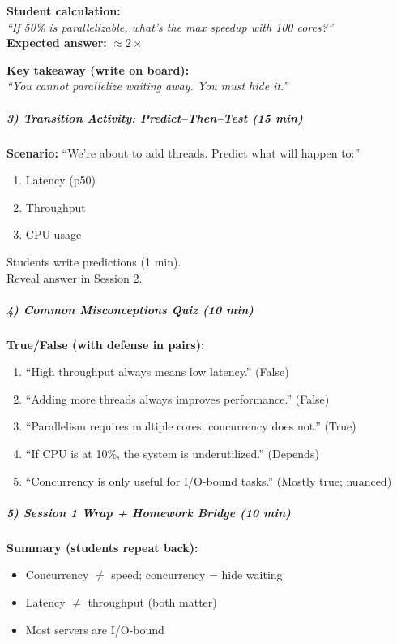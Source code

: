 \documentclass[11pt,a4paper]{article}
\begin{document}
\textbf{Student calculation:}\\
\textit{``If 50\% is parallelizable, what's the max speedup with 100 cores?''}\\
\textbf{Expected answer:} $\approx 2\times$

\textbf{Key takeaway (write on board):}\\
\textit{``You cannot parallelize waiting away. You must hide it.''}

\subparagraph{3) Transition Activity: Predict--Then--Test (15 min)}

\textbf{Scenario:} ``We're about to add threads. Predict what will happen to:''

\begin{enumerate}[leftmargin=*]
\item Latency (p50)
\item Throughput
\item CPU usage
\end{enumerate}

Students write predictions (1 min).\\
Reveal answer in Session 2.

\subparagraph{4) Common Misconceptions Quiz (10 min)}

\textbf{True/False (with defense in pairs):}
\begin{enumerate}[leftmargin=*]
\item ``High throughput always means low latency.'' (False)
\item ``Adding more threads always improves performance.'' (False)
\item ``Parallelism requires multiple cores; concurrency does not.'' (True)
\item ``If CPU is at 10\%, the system is underutilized.'' (Depends)
\item ``Concurrency is only useful for I/O-bound tasks.'' (Mostly true; nuanced)
\end{enumerate}

\subparagraph{5) Session 1 Wrap + Homework Bridge (10 min)}

\textbf{Summary (students repeat back):}
\begin{itemize}[leftmargin=*]
\item Concurrency $\neq$ speed; concurrency = hide waiting
\item Latency $\neq$ throughput (both matter)
\item Most servers are I/O-bound
\end{itemize}
\end{document}
